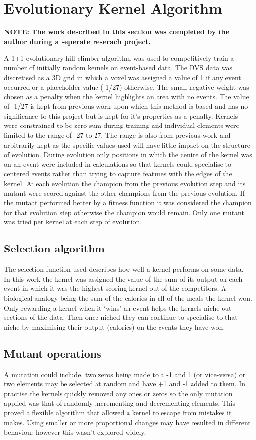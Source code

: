 \chapter{Evolutionary Kernel Algorithm}
\label{ch:evolution}

\textbf{NOTE: The work described in this section was completed by the author during a seperate reserach project.}

A 1+1 evolutionary hill climber algorithm was used to competitively train a number of initially random kernels on event-based data.
The DVS data was discretised as a 3D grid in which a voxel was assigned a value of 1 if any event occurred or a placeholder value (-1/27) otherwise.
The small negative weight was chosen as a penalty when the kernel highlights an area with no events.
The value of -1/27 is kept from previous work upon which this method is based and has no significance to this project but is kept for it's properties as a penalty. 
Kernels were constrained to be zero sum during training and individual elements were limited to the range of -27 to 27.
The range is also from previous work and arbitrarily kept as the specific values used will have little impact on the structure of evolution. 
During evolution only positions in which the centre of the kernel was on an event were included in calculations so that kernels could specialise to centered events rather than trying to capture features with the edges of the kernel. 
At each evolution the champion from the previous evolution step and its mutant were scored against the other champions from the previous evolution.
If the mutant performed better by a fitness function it was considered the champion for that evolution step otherwise the champion would remain. 
Only one mutant was tried per kernel at each step of evolution.

\section{Selection algorithm}
The selection function used describes how well a kernel performs on some data. 
In this work the kernel was assigned the value of the sum of its output on each event in which it was the highest scoring kernel out of the competitors. 
A biological analogy being the sum of the calories in all of the meals the kernel won. 
Only rewarding a kernel when it ‘wins’ an event helps the kernels niche out sections of the data. 
Then once niched they can continue to specialise to that niche by maximising their output (calories) on the events they have won. 

\section{Mutant operations}
A mutation could include, two zeros being made to a -1 and 1 (or vice-versa) or two elements may be selected at random and have +1 and -1 added to them. In practise the kernels quickly removed any ones or zeros so the only mutation applied was that of randomly incrementing and decrementing elements. This proved a flexible algorithm that allowed a kernel to escape from mistakes it makes. Using smaller or more proportional changes may have resulted in different behaviour however this wasn’t explored widely. 


